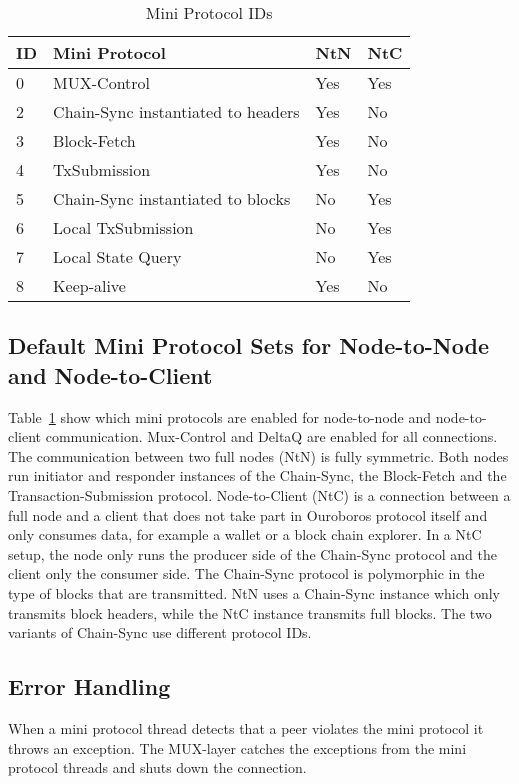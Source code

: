 \noindent{}
\newline{}
\newline{}
\begin{table}[ht]
\centering
\begin{tabular}{|l|l|l|l|}
  \hline
  ID & Mini Protocol                         & NtN  & NtC \\ \hline
  0  & MUX-Control                           & Yes  & Yes \\ \hline
  2  & Chain-Sync instantiated to headers    & Yes  & No \\ \hline
  3  & Block-Fetch                           & Yes  & No  \\ \hline
  4  & TxSubmission                          & Yes  & No   \\ \hline
  5  & Chain-Sync instantiated to blocks     & No   & Yes  \\ \hline
  6  & Local TxSubmission                    & No   & Yes  \\ \hline
  7  & Local State Query                     & No   & Yes \\\hline
  8  & Keep-alive                            & Yes  & No  \\\hline
\end{tabular}
\caption{Mini Protocol IDs}
\label{mini-protocol-id}
\end{table}

\subsection{Default Mini Protocol Sets for Node-to-Node and Node-to-Client}
Table~\ref{mini-protocol-id} show which mini protocols are enabled for node-to-node
and node-to-client communication.
Mux-Control and DeltaQ are enabled for all connections.
The communication between two full nodes (NtN) is fully symmetric.
Both nodes run initiator and responder instances of the
Chain-Sync, the Block-Fetch and the Transaction-Submission protocol.
Node-to-Client (NtC) is a connection between a full node and a client that does not take part in
Ouroboros protocol itself and only consumes data, for example a wallet or a block chain explorer.
In a NtC setup, the node only runs the producer side of the Chain-Sync protocol and the client only the
consumer side.
The Chain-Sync protocol is polymorphic in the type of blocks that are transmitted.
NtN uses a Chain-Sync instance which only transmits block headers, while the NtC instance transmits
full blocks.
The two variants of Chain-Sync use different protocol IDs.


\subsection{Error Handling}
When a mini protocol thread detects that a peer violates the mini protocol it throws an exception.
The MUX-layer catches the exceptions from the mini protocol threads and shuts down the connection.
